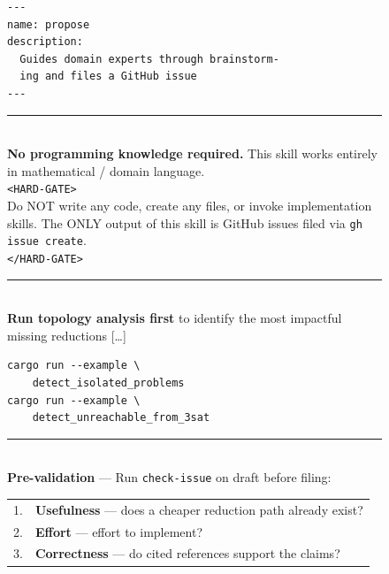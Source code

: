 \documentclass{article}
\begin{document}
\begin{figure}[htbp]
  \centering
  \begin{minipage}[t]{0.525\textwidth}
  \begin{tcolorbox}[
    colback=gray!5, colframe=gray!80,
    title={\textbf{\texttt{propose}} --- advisor skill (excerpts)},
    fonttitle=\footnotesize, boxrule=0.4pt, arc=2pt, left=4pt, right=4pt, top=2pt, bottom=2pt,
    equal height group=skillbox,
  ]
  \footnotesize
  \begin{lstlisting}[basicstyle=\ttfamily\scriptsize, numbers=none, frame=none, aboveskip=0pt, belowskip=0pt, xleftmargin=4pt]
---
name: propose
description:
  Guides domain experts through brainstorm-
  ing and files a GitHub issue
---
  \end{lstlisting}
  \vspace{-4pt}
  \rule{\linewidth}{0.3pt}\\[3pt]
  \textbf{No programming knowledge required.}
  This skill works entirely in mathematical / domain language.\\[3pt]
  \texttt{<HARD-GATE>}\\
  Do NOT write any code, create any files, or invoke implementation skills.
  The ONLY output of this skill is GitHub issues filed via \texttt{gh issue create}.\\
  \texttt{</HARD-GATE>}\\[3pt]
  \rule{\linewidth}{0.3pt}\\[3pt]
  \textbf{Run topology analysis first} to identify the most impactful missing reductions [\ldots]\\
  \begin{lstlisting}[basicstyle=\ttfamily\scriptsize, numbers=none, frame=none, aboveskip=-5pt, belowskip=2pt, xleftmargin=4pt]
cargo run --example \
    detect_isolated_problems
cargo run --example \
    detect_unreachable_from_3sat
  \end{lstlisting}
  \vspace{-2pt}
  \rule{\linewidth}{0.3pt}\\[3pt]
  \textbf{Pre-validation} --- Run \texttt{check-issue} on draft before filing:\\[2pt]
  \begin{tabular}{@{}r@{~}l@{}}
    1. & \textbf{Usefulness} --- does a cheaper reduction path already exist? \\
    2. & \textbf{Effort} --- effort to implement? \\
    3. & \textbf{Correctness} --- do cited references support the claims? \\

\end{tabular}
\end{tcolorbox}
\end{minipage}
\end{figure}
\end{document}
